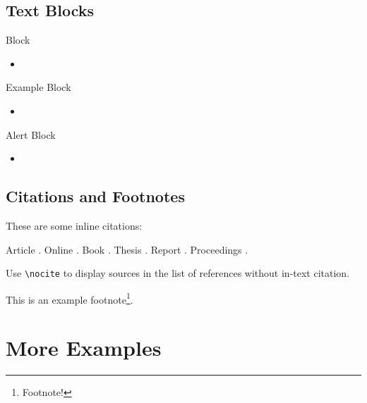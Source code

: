 \documentclass[aspectratio=169,xcolor={svgnames}]{beamer}
\begin{document}
\subsection{Text Blocks}
\begin{frame}{\insertsubsectionhead}
  \begin{block}{Block}
    \lipsum[4][1-3]
    \begin{itemize}
      \item \lipsum[4][4]
    \end{itemize}
  \end{block}

  \begin{exampleblock}{Example Block}
    \lipsum[4][5-7]
    \begin{itemize}
      \item \lipsum[4][8]
    \end{itemize}
  \end{exampleblock}

  \begin{alertblock}{Alert Block}
    \lipsum[4][13]
    \begin{itemize}
      \item \lipsum[4][11-12]
    \end{itemize}
  \end{alertblock}
\end{frame}

\subsection{Citations and Footnotes}
\begin{frame}[fragile]{\insertsubsectionhead}
  These are some inline citations:

  Article \cite{sigfridsson}. Online \cite{ctan}. Book \cite{aristotle:anima}.
  Thesis \cite{geer}. Report \cite{padhye}. Proceedings \cite{moraux}.

  Use \verb|\nocite| to display sources in the list of references without
  in-text citation.

  \vspace{8pt}
  This is an example footnote\footnote{Footnote!}.
  \nocite{angenendt,vangennep,britannica}
\end{frame}

\section{More Examples}
\end{document}
